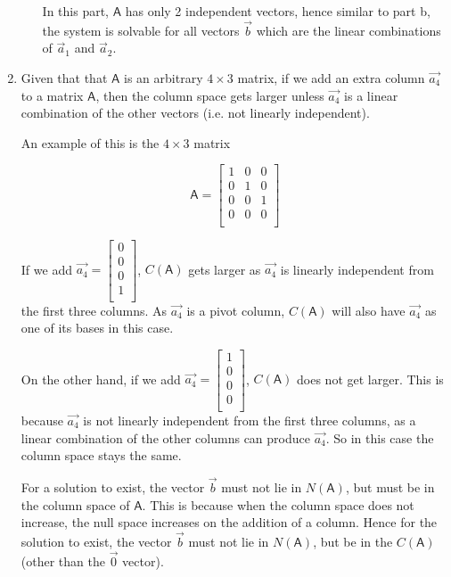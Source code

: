 \documentclass[a4paper, 11pt]{article}
\newcommand{\mat}[1]{\boldsymbol { \mathsf{#1}} }
\begin{document}
\begin{enumerate}
\begin{enumerate}
In this part, $\mat A$ has only 2 independent vectors, hence similar to part b, the system is solvable for all vectors $\vec b$ which are the linear combinations of $\vec a_1$ and $\vec a_2$.

\end{enumerate}

\item Given that that $\mat{A}$ is an arbitrary $4 \times 3$ matrix, if we add an extra column $\vec{a_4}$ to a matrix $\mat{A}$, then the column space gets larger unless $\vec{a_4}$ is a linear combination of the other vectors (i.e. not linearly independent).

An example of this is the $4 \times 3$ matrix

\begin{equation*}
\mat{A} = 
	\begin{bmatrix}
	1 & 0 & 0 \\
	0 & 1 & 0 \\
	0 & 0 & 1 \\
	0 & 0 & 0 \\
	\end{bmatrix}
\end{equation*}

If we add $\vec{a_4} = \begin{bmatrix}
0 \\
0 \\
0 \\
1 \\
\end{bmatrix}$, $C(\mat{A})$ gets larger as $\vec{a_4}$ is linearly independent from the first three columns. As $\vec{a_4}$ is a pivot column, $C(\mat{A})$ will also have $\vec{a_4}$ as one of its bases in this case.

On the other hand, if we add $\vec{a_4} = \begin{bmatrix}
1 \\
0 \\
0 \\
0 \\
\end{bmatrix}$, $C(\mat{A})$ does not get larger. This is because $\vec{a_4}$ is not linearly independent from the first three columns, as a linear combination of the other columns can produce $\vec{a_4}$. So in this case the column space stays the same.

For a solution to exist, the vector $\vec b$ must not lie in $N(\mat{A})$, but must be in the column space of $\mat{A}$. This is because when the column space does not increase, the null space increases on the addition of a column. Hence for the solution to exist, the vector $\vec{b}$ must not lie in $N(\mat{A})$, but be in the $C(\mat{A})$ (other than the $\vec{0}$ vector).


\end{enumerate}
\end{document}
